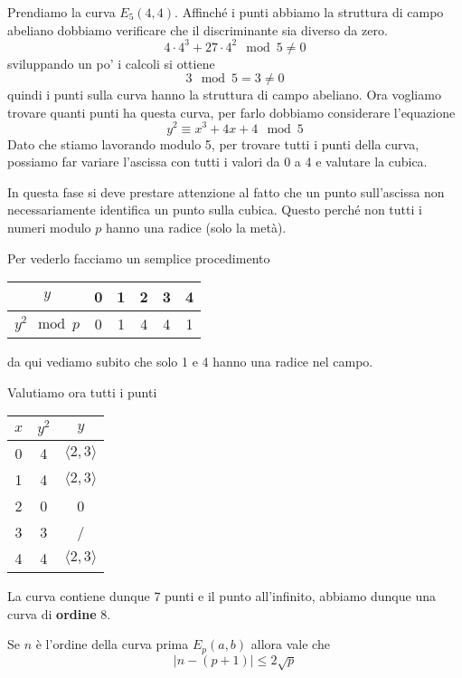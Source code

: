 \begin{example}
	Prendiamo la curva $E_5(4, 4)$. Affinch\'e i punti abbiamo la struttura di campo abeliano dobbiamo verificare
	che il discriminante sia diverso da zero.
	\[ 4 \cdot 4^3 + 27 \cdot 4^2 \mod{5} \neq 0 \]
	sviluppando un po' i calcoli si ottiene
	\[ 3 \mod{5} = 3 \neq 0 \]
	quindi i punti sulla curva hanno la struttura di campo abeliano. Ora vogliamo trovare quanti punti ha questa
	curva, per farlo dobbiamo considerare l'equazione
	\[ y^2 \equiv x^3 + 4x + 4 \mod{5} \]
	Dato che stiamo lavorando modulo 5, per trovare tutti i punti della curva, possiamo far variare l'ascissa con
	tutti i valori da 0 a 4 e valutare la cubica.

	In questa fase si deve prestare attenzione al fatto che un punto sull'ascissa non necessariamente identifica
	un punto sulla cubica. Questo perch\'e non tutti i numeri modulo $p$ hanno una radice (solo la met\`a).

	Per vederlo facciamo un semplice procedimento
	\begin{center}
		\begin{tabular}{ c | c c c c c }
			$y$           & 0 & 1 & 2 & 3 & 4 \\
			\hline
			$y^2 \mod{p}$ & 0 & 1 & 4 & 4 & 1
		\end{tabular}
	\end{center}
	da qui vediamo subito che solo 1 e 4 hanno una radice nel campo.

	Valutiamo ora tutti i punti
	\begin{center}
		\begin{tabular}{ c | c | c }
			$x$ & $y^2$ & $y$                    \\
			\hline
			0   & 4     & $\langle 2, 3 \rangle$ \\
			1   & 4     & $\langle 2, 3 \rangle$ \\
			2   & 0     & 0                      \\
			3   & 3     & /                      \\
			4   & 4     & $\langle 2, 3 \rangle$
		\end{tabular}
	\end{center}
	La curva contiene dunque 7 punti e il punto all'infinito, abbiamo dunque una curva di \textbf{ordine} 8.
\end{example}

\begin{theorem}
	Se $n$ \`e l'ordine della curva prima $E_p(a, b)$ allora vale che
	\[ |n - (p + 1)| \leq 2 \sqrt{p} \]
\end{theorem}

